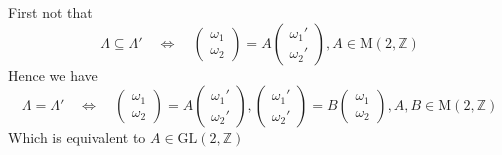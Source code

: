 \documentclass[../main.tex]{subfiles}
\begin{document}
\begin{problem}
First not that
\[
\Lambda \subseteq \Lambda' \quad \Leftrightarrow \quad 
\begin{pmatrix}
\omega_{1}\\ 
\omega_{2}
\end{pmatrix}
=A
\begin{pmatrix}
\omega_{1}'\\ 
\omega_{2}'
\end{pmatrix}
,A \in \mathrm{M}(2,\mathbb{Z})
\]
Hence we have
\[
\Lambda = \Lambda' \quad \Leftrightarrow \quad 
\begin{pmatrix}
\omega_{1}\\ 
\omega_{2}
\end{pmatrix}
=A
\begin{pmatrix}
\omega_{1}'\\ 
\omega_{2}'
\end{pmatrix}
,
\begin{pmatrix}
\omega_{1}'\\ 
\omega_{2}'
\end{pmatrix}
=B
\begin{pmatrix}
\omega_{1}\\ 
\omega_{2}
\end{pmatrix}
,A,B \in \mathrm{M}(2,\mathbb{Z})
\]
Which is equivalent to \(A\in \mathrm{GL}(2,\mathbb{Z})\)
\end{problem}
\end{document}
